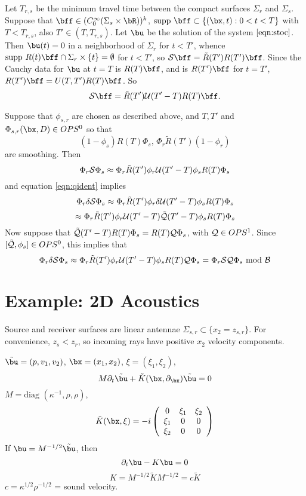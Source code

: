 Let $T_{r,s}$ be the minimum travel time between the compact surfaces
$\Sigma_r$ and $\Sigma_s$. Suppose that $\bff \in
(C_0^{\infty}(\Sigma_s\times \bR))^k$, $\mbox{supp }\bff \subset
\{(\bx,t):0 <t < T\}$ with $T < T_{r,s}$, also $T' \in (T,T_{r,s})$.
Let $\bu$ be the solution of the system $\ref{eqn:stoc}$.
Then $\bu(t)=0$ in a neighborhood of $\Sigma_r$ for $t<T'$, whence $\mbox{supp }R(t)\bff \cap \Sigma_r \times \{t\} = \emptyset$ for
$t<T'$, so ${\cal S}\bff = \tilde{R}(T')R(T')\bff$. Since the Cauchy
data for $\bu$ at $t=T$ is $R(T)\bff$, and is $R(T')\bff$ for $t=T'$,
$R(T')\bff = U(T,T')R(T)\bff$. So 
\begin{equation}
  \label{eqn:comprep}
  {\cal S}\bff = \tilde{R}(T'){\cal U}(T'-T)R(T)\bff.
\end{equation}

Suppose that $\phi_{s,r}$ are chosen as described above, and $T, T'$ and
$\Phi_{s,r}(\bx,D) \in OPS^0$ so that
\[
  (1-\phi_s) R(T)\Phi_{s}, \, \Phi_r\tilde{R}(T') (1-\phi_r)
\]
are smoothing. Then
\[
  \Phi_r {\cal S} \Phi_s \approx \Phi_r \tilde{R} (T') \phi_r {\cal U}(T'-T)
  \phi_s R(T)\Phi_s
\]
and equation \ref{eqn:qident} implies
\[
  \Phi_r {\delta \cal S} \Phi_s \approx \Phi_r \tilde{R} (T') \phi_r
  \delta {\cal U}(T'-T)
  \phi_s R(T)\Phi_s
\]
\[
  \approx \Phi_r \tilde{R} (T') \phi_r
   {\cal U}(T'-T)\tilde{{\cal Q}}(T'-T)
  \phi_s R(T)\Phi_s
\]
Now suppose that $\tilde{{\cal Q}}(T'-T) R(T) \Phi_s = R(T) {\cal Q}
 \Phi_s$, with ${\cal Q} \in OPS^1$. Since $[\tilde{{\cal Q}}, \phi_s]
 \in OPS^0$, this
implies that
\begin{equation}
  \label{eqn:qident2}
  \Phi_r {\delta \cal S} \Phi_s \approx \Phi_r \tilde{R} (T') \phi_r
   {\cal U}(T'-T)
  \phi_s R(T) {\cal Q}\Phi_s = \Phi_r {\cal S} {\cal
    Q}\Phi_s \mbox{ mod } {\cal B}
\end{equation}


\section{Example: 2D Acoustics}
Source and receiver surfaces are linear antennae $\Sigma_{s,r} \subset
\{x_2=z_{s,r}\}$. For convenience, $z_s < z_r$, so incoming rays have
positive $x_2$ velocity components.

$\tilde{\bu} = (p,v_1,v_2)$, $\bx = (x_1,x_2)$,  $ \xi = (\xi_1,\xi_2)$,
\[
  M\partial_t \tilde{\bu} + \tilde{K}(\bx, \partial_{\bx})\tilde{\bu} = 0
\]
$M=\mbox{diag }(\kappa^{-1},\rho,\rho)$, 
\[
  \tilde{K}(\bx,\xi) =
 -i\left(
    \begin{array}{ccc}
      0 & \xi_1 & \xi_2 \\
      \xi_1 & 0 & 0 \\
      \xi_2 & 0 & 0
    \end{array}
  \right)
\]
If $\bu = M^{-1/2}\tilde{\bu}$, then
\[
  \partial_t \bu - K \bu = 0
\]
\[
  K = M^{-1/2}\tilde{K} M^{-1/2} = c\tilde{K}
\]
$c = \kappa^{1/2}\rho^{-1/2} $ = sound velocity.

